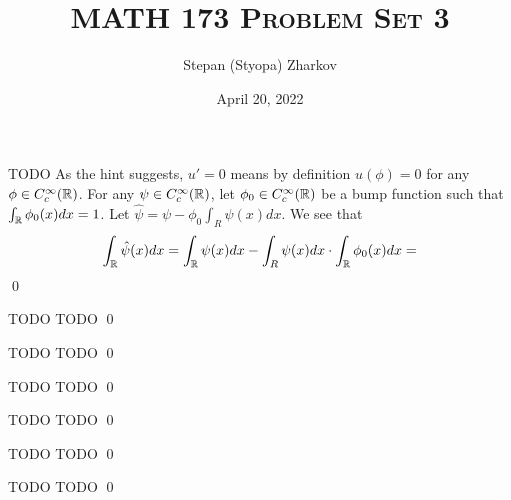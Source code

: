 \documentclass{article}
\title{\textsc{MATH 173 Problem Set 3}}
\author{Stepan (Styopa) Zharkov}
\date{April 20, 2022}
\newcommand{\Cc}{{C_c^\infty(\RR)}}
\begin{document}
\maketitle
{} TODO \tri
\hop
\solution
As the hint suggests, $u' = 0$ means by definition $u(\phi) = 0$ for any $\phi \in C_c^\infty(\mathbb{R})$. For any $\psi \in \Cc$, let $\phi_0\in \Cc$ be a bump function such that $\int_{\mathbb{R}} \phi_0(x)dx = 1$. Let $\hat{\psi} = \psi - \phi_0\int_R\psi(x)dx$. We see that 
\[\int_{\mathbb{R}} \hat{\psi}(x)dx = \int_{\mathbb{R}} \psi(x)dx -\int_R\psi(x)dx\cdot \int_{\mathbb{R}}\phi_0(x)dx =  \]
\qed


\newpage
{} TODO \tri
\hop
\solution
TODO
\qed


\newpage
{} TODO \tri
\hop
\solution
TODO
\qed


\newpage
{} TODO \tri
\hop
\solution
TODO
\qed


\newpage
{} TODO \tri
\hop
\solution
TODO
\qed


\newpage
{} TODO \tri
\hop
\solution
TODO
\qed


\newpage
{} TODO \tri
\hop
\solution
TODO
\qed


\newpage
\end{document}
